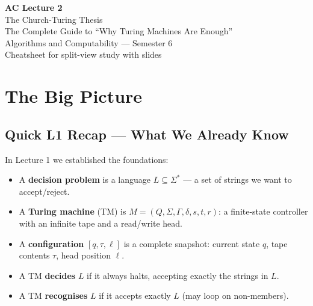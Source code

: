 \documentclass[11pt,a4paper]{article}
\begin{document}
\begin{center}
{\Huge\bfseries AC Lecture 2}\\[0.5em]
{\LARGE The Church-Turing Thesis}\\[0.3em]
{\large The Complete Guide to ``Why Turing Machines Are Enough''}\\[1em]
{\normalsize Algorithms and Computability --- Semester 6}\\
{\normalsize Cheatsheet for split-view study with slides}
\end{center}

\vspace{1em}
\tableofcontents
\newpage

\section{The Big Picture}

\subsection{Quick L1 Recap --- What We Already Know}

In Lecture 1 we established the foundations:

\begin{itemize}[nosep]
\item A \textbf{decision problem} is a language $L \subseteq \Sigma^*$ --- a set of strings we want to accept/reject.
\item A \textbf{Turing machine} (TM) is $M = (Q, \Sigma, \Gamma, \delta, s, t, r)$: a finite-state controller with an infinite tape and a read/write head.
\item A \textbf{configuration} $[q, \tau, \ell]$ is a complete snapshot: current state $q$, tape contents $\tau$, head position $\ell$.
\item A TM \textbf{decides} $L$ if it always halts, accepting exactly the strings in $L$.
\item A TM \textbf{recognises} $L$ if it accepts exactly $L$ (may loop on non-members).
\end{itemize}
\end{document}
